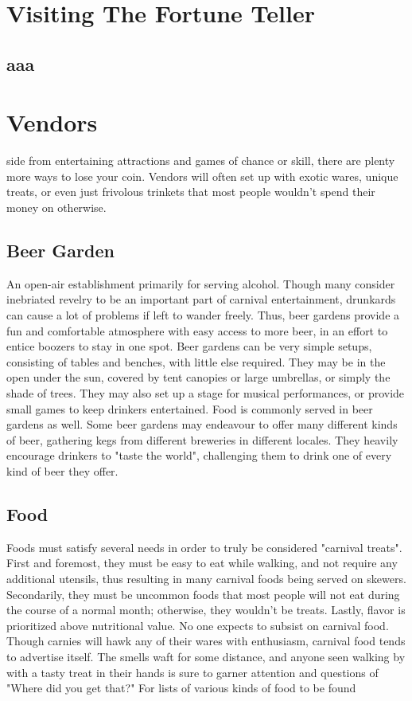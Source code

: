 \documentclass[10pt,a4paper,twoside,bg=print,twocolumn,openany,nodeprecatedcode]{dndbook}
\begin{document}
\chapter{Visiting The Fortune Teller}

\section{aaa}

\chapter{Vendors}
side from entertaining attractions and games of chance or skill, there are plenty more ways to lose your coin. Vendors will often set up with exotic wares, unique treats, or even just frivolous trinkets that most people wouldn't spend their money on otherwise.

\section{Beer Garden }
An open-air establishment primarily for serving alcohol. Though many consider inebriated revelry to be an important part of carnival entertainment, drunkards can cause a lot of problems if left to wander freely. Thus, beer gardens provide a fun and comfortable atmosphere with easy access to more beer, in an effort to entice boozers to stay in one spot.
Beer gardens can be very simple setups, consisting of tables and benches, with little else required. They may be in the open under the sun, covered by tent canopies or large umbrellas, or simply the shade of trees. They may also set up a stage for musical performances, or provide small games to keep drinkers entertained.
Food is commonly served in beer gardens as well. Some beer gardens may endeavour to offer many different kinds of beer, gathering kegs from different breweries in different locales. They heavily encourage drinkers to "taste the world", challenging them to drink one of every kind of beer they offer.
\section{Food}
Foods must satisfy several needs in order to truly be considered "carnival treats". First and foremost, they must be easy to eat while walking, and not require any additional utensils, thus resulting in many carnival foods being served on skewers. Secondarily, they must be uncommon foods that most people will not eat during the course of a normal month; otherwise, they wouldn't be treats. Lastly, flavor is prioritized above nutritional value. No one expects to subsist on carnival food.
Though carnies will hawk any of their wares with enthusiasm, carnival food tends to advertise itself. The smells waft for some distance, and anyone seen walking by with a tasty treat in their hands is sure to garner attention and questions of "Where did you get that?"
For lists of various kinds of food to be found
\end{document}
